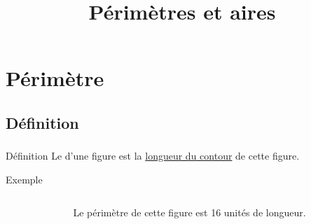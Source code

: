 \documentclass[xcolor=table]{beamer}
\title{Périmètres et aires}
\author{}\institute{}
\begin{document}
	
	
	
\begin{frame}
	\titlepage
\end{frame}

\section{Périmètre}

\subsection{Définition}

\begin{frame}
\frametitle{ }  
\framesubtitle{ }	

\begin{exampleblock}{Définition}
	Le  d'une figure est la \underline{longueur du contour} de cette figure.
\end{exampleblock}

\begin{block}{Exemple}
	\begin{columns}[onlytextwidth]
		\begin{column}{0.465\textwidth}
		\end{column}
		\begin{column}{0.465\textwidth}
			Le périmètre de cette figure est 16 unités de longueur.			
		\end{column}
	\end{columns}
		
\end{block}	


\end{frame}
\end{document}
